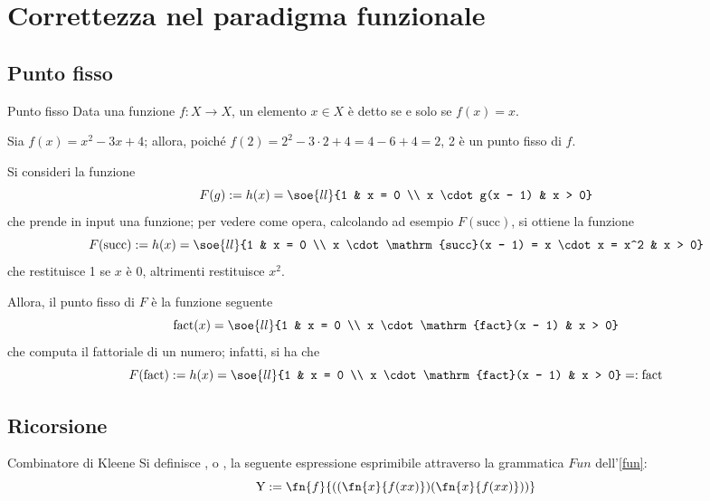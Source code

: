 \documentclass[a4paper, 12pt]{report}
\begin{document}
    \section{Correttezza nel paradigma funzionale}

    \subsection{Punto fisso}

    \begin{frameddefn}{Punto fisso}
        Data una funzione $f: X \to X$, un elemento $x \in X$ è detto  se e solo se $f(x) = x$.
    \end{frameddefn}

    \begin{example}
        Sia $f(x) = x^2 -3x +4$; allora, poiché $f(2) = 2^2 - 3 \cdot 2 + 4 = 4 - 6 + 4 = 2$, 2 è un punto fisso di $f$.
    \end{example}

    \begin{example}
        Si consideri la funzione $$F(g) := h(x) = \soe{ll}{1 & x = 0 \\ x \cdot g(x - 1) & x > 0}$$ che prende in input una funzione; per vedere come opera, calcolando ad esempio $F(\mathrm{succ})$, si ottiene la funzione $$F(\mathrm{succ}) := h(x) = \soe{ll}{1 & x = 0 \\ x \cdot \mathrm{succ}(x - 1) = x \cdot x = x^2 & x > 0}$$ che restituisce 1 se $x$ è 0, altrimenti restituisce $x^2$.

        Allora, il punto fisso di $F$ è la funzione seguente $$\mathrm{fact}(x) = \soe{ll}{1 & x = 0 \\ x \cdot \mathrm{fact}(x - 1) & x > 0}$$ che computa il fattoriale di un numero; infatti, si ha che $$F(\mathrm{fact}) := h(x) = \soe{ll}{1 & x = 0 \\ x \cdot \mathrm{fact}(x - 1) & x > 0} =: \mathrm{fact}$$
    \end{example}

    \subsection{Ricorsione}

    \begin{frameddefn}{Combinatore di Kleene}
        Si definisce , o , la seguente espressione esprimibile attraverso la grammatica $Fun$ dell'\cref{fun}: $$\mathrm Y := \fn{f}{((\fn{x}{f(xx)})(\fn{x}{f(xx)}))}$$
    \end{frameddefn}
\end{document}
